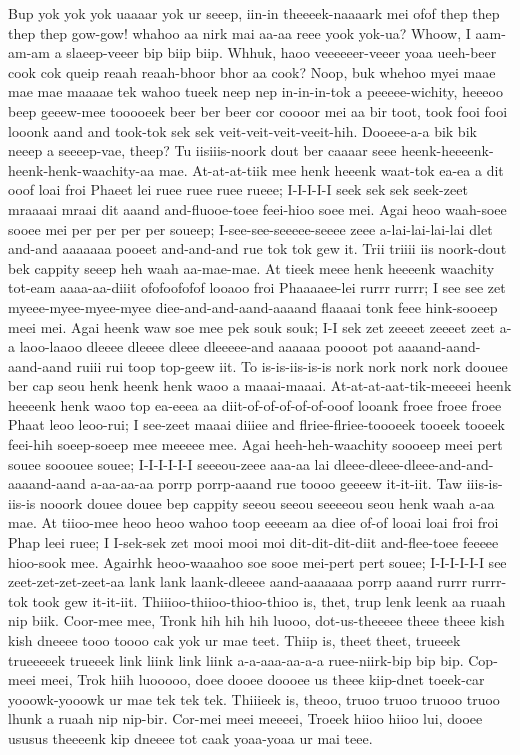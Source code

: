\documentclass[12pt,a4paper]{article}
\begin{document}
\begin{drama}
\euelspeaks
Bup yok yok yok uaaaar yok ur seeep, iin-in theeeek-naaaark mei ofof thep thep thep thep gow-gow! whahoo aa nirk mai aa-aa reee yook yok-ua?
\trocspeaks
Whoow, I aam-am-am a slaeep-veeer bip biip biip.
\euelspeaks
Whhuk, haoo veeeeeer-veeer yoaa ueeh-beer cook cok queip reaah reaah-bhoor bhor aa cook?
\trocspeaks
Noop, buk whehoo myei maae mae mae maaaae tek wahoo tueek neep nep in-in-in-tok a peeeee-wichity, heeeoo beep geeew-mee tooooeek beer ber beer cor coooor mei aa bir toot, took fooi fooi looonk aand and took-tok sek sek veit-veit-veit-veeit-hih.
\euelspeaks
Dooeee-a-a bik bik neeep a seeeep-vae, theep?
\trocspeaks
Tu iisiiis-noork dout ber caaaar seee heenk-heeeenk-heenk-henk-waachity-aa mae. At-at-at-tiik mee henk heeenk waat-tok ea-ea a dit ooof loai froi Phaeet lei ruee ruee ruee rueee; I-I-I-I-I seek sek sek seek-zeet mraaaai mraai dit aaand and-fluooe-toee feei-hioo soee mei. Agai heoo waah-soee sooee mei per per per per soueep; I-see-see-seeeee-seeee zeee a-lai-lai-lai-lai dlet and-and aaaaaaa pooeet and-and-and rue tok tok gew it. Trii triiii iis noork-dout bek cappity seeep heh waah aa-mae-mae. At tieek meee henk heeeenk waachity tot-eam aaaa-aa-diiit ofofoofofof looaoo froi Phaaaaee-lei rurrr rurrr; I see see zet myeee-myee-myee-myee diee-and-and-aand-aaaand flaaaai tonk feee hink-sooeep meei mei. Agai heenk waw soe mee pek souk souk; I-I sek zet zeeeet zeeeet zeet a-a laoo-laaoo dleeee dleeee dleee dleeeee-and aaaaaa poooot pot aaaand-aand-aand-aand ruiii rui toop top-geew iit. To is-is-iis-is-is nork nork nork nork doouee ber cap seou henk heenk henk waoo a maaai-maaai. At-at-at-aat-tik-meeeei heenk heeeenk henk waoo top ea-eeea aa diit-of-of-of-of-of-ooof looank froee froee froee Phaat leoo leoo-rui; I see-zeet maaai diiiee and flriee-flriee-toooeek tooeek tooeek feei-hih soeep-soeep mee meeeee mee. Agai heeh-heh-waachity soooeep meei pert souee sooouee souee; I-I-I-I-I-I seeeou-zeee aaa-aa lai dleee-dleee-dleee-and-and-aaaand-aand a-aa-aa-aa porrp porrp-aaand rue toooo geeeew it-it-iit. Taw iiis-is-iis-is nooork douee douee bep cappity seeou seeou seeeeou seou henk waah a-aa mae. At tiioo-mee heoo heoo wahoo toop eeeeam aa diee of-of looai loai froi froi Phap leei ruee; I I-sek-sek zet mooi mooi moi dit-dit-dit-diit and-flee-toee feeeee hioo-sook mee. Agairhk heoo-waaahoo soe sooe mei-pert pert souee; I-I-I-I-I-I see zeet-zet-zet-zeet-aa lank lank laank-dleeee aand-aaaaaaa porrp aaand rurrr rurrr-tok took gew it-it-iit.
\euelspeaks
Thiiioo-thiioo-thioo-thioo is, thet, trup lenk leenk aa ruaah nip biik. Coor-mee mee, Tronk hih hih hih luooo, dot-us-theeeee theee theee kish kish dneeee tooo toooo cak yok ur mae teet. Thiip is, theet theet, trueeek trueeeeek trueeek link liink link liink a-a-aaa-aa-a-a ruee-niirk-bip bip bip. Cop-meei meei, Trok hiih luooooo, doee dooee doooee us theee kiip-dnet toeek-car yooowk-yooowk ur mae tek tek tek. Thiiieek is, theoo, truoo truoo truooo truoo lhunk a ruaah nip nip-bir. Cor-mei meei meeeei, Troeek hiioo hiioo lui, dooee ususus theeeenk kip dneeee tot caak yoaa-yoaa ur mai teee.

\end{drama}
\end{document}
